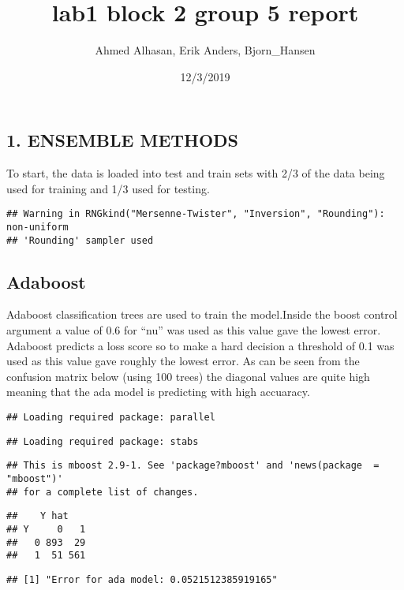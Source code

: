 \documentclass[]{article}
\title{lab1 block 2 group 5 report}
\author{Ahmed Alhasan, Erik Anders, Bjorn\_Hansen}
\date{12/3/2019}
\begin{document}
\maketitle

\hypertarget{ensemble-methods}{%
\subsection{1. ENSEMBLE METHODS}\label{ensemble-methods}}

To start, the data is loaded into test and train sets with 2/3 of the
data being used for training and 1/3 used for testing.

\begin{verbatim}
## Warning in RNGkind("Mersenne-Twister", "Inversion", "Rounding"): non-uniform
## 'Rounding' sampler used
\end{verbatim}

\hypertarget{adaboost}{%
\subsection{Adaboost}\label{adaboost}}

Adaboost classification trees are used to train the model.Inside the
boost control argument a value of 0.6 for ``nu'' was used as this value
gave the lowest error. Adaboost predicts a loss score so to make a hard
decision a threshold of 0.1 was used as this value gave roughly the
lowest error. As can be seen from the confusion matrix below (using 100
trees) the diagonal values are quite high meaning that the ada model is
predicting with high accuaracy.

\begin{verbatim}
## Loading required package: parallel
\end{verbatim}

\begin{verbatim}
## Loading required package: stabs
\end{verbatim}

\begin{verbatim}
## This is mboost 2.9-1. See 'package?mboost' and 'news(package  = "mboost")'
## for a complete list of changes.
\end{verbatim}

\begin{verbatim}
##    Y hat
## Y     0   1
##   0 893  29
##   1  51 561
\end{verbatim}

\begin{verbatim}
## [1] "Error for ada model: 0.0521512385919165"
\end{verbatim}
\end{document}
